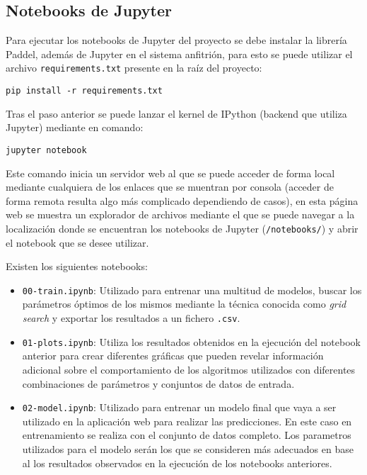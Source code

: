 \subsection{Notebooks de Jupyter}

Para ejecutar los notebooks de Jupyter del proyecto se debe instalar la librería
Paddel, además de Jupyter en el sistema anfitrión, para esto se puede utilizar
el archivo \texttt{requirements.txt} presente en la raíz del proyecto:

\texttt{pip install -r requirements.txt}

Tras el paso anterior se puede lanzar el kernel de IPython (backend que utiliza
Jupyter) mediante en comando:

\texttt{jupyter notebook}

Este comando inicia un servidor web al que se puede acceder de forma local
mediante cualquiera de los enlaces que se muentran por consola (acceder de forma
remota resulta algo más complicado dependiendo de casos), en esta página web se
muestra un explorador de archivos mediante el que se puede navegar a la
localización donde se encuentran los notebooks de Jupyter (\texttt{/notebooks/})
y abrir el notebook que se desee utilizar.

Existen los siguientes notebooks:

\begin{itemize}
    \item \texttt{00-train.ipynb}: Utilizado para entrenar una multitud de
    modelos, buscar los parámetros óptimos de los mismos mediante la técnica
    conocida como \textit{grid search} y exportar los resultados a un fichero
    \texttt{.csv}.
    \item \texttt{01-plots.ipynb}: Utiliza los resultados obtenidos en la
    ejecución del notebook anterior para crear diferentes gráficas que pueden
    revelar información adicional sobre el comportamiento de los algoritmos
    utilizados con diferentes combinaciones de parámetros y conjuntos de datos
    de entrada.
    \item \texttt{02-model.ipynb}: Utilizado para entrenar un modelo final que
    vaya a ser utilizado en la aplicación web para realizar las predicciones. En
    este caso en entrenamiento se realiza con el conjunto de datos completo. Los
    parametros utilizados para el modelo serán los que se consideren más
    adecuados en base al los resultados observados en la ejecución de los
    notebooks anteriores.
\end{itemize}

